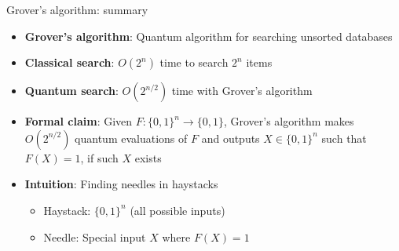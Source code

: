 \documentclass[aspectratio=169, lualatex, handout]{beamer}
\begin{document}
\begin{frame}{Grover's algorithm: summary}
	\begin{itemize}
		\item \textbf{Grover's algorithm}: Quantum algorithm for searching unsorted databases
		\item \textbf{Classical search}: $O(2^n)$ time to search $2^n$ items
		\item \textbf{Quantum search}: $O(2^{n/2})$ time with Grover's algorithm
		\item \textbf{Formal claim}: Given $F: \{0,1\}^n \rightarrow \{0,1\}$, Grover's algorithm makes $O(2^{n/2})$ quantum evaluations of $F$ and outputs $X \in \{0,1\}^n$ such that $F(X) = 1$, if such $X$ exists
		\item \textbf{Intuition}: Finding needles in haystacks
		      \begin{itemize}
			      \item Haystack: $\{0,1\}^n$ (all possible inputs)
			      \item Needle: Special input $X$ where $F(X) = 1$
		      \end{itemize}
	\end{itemize}
\end{frame}
\end{document}
